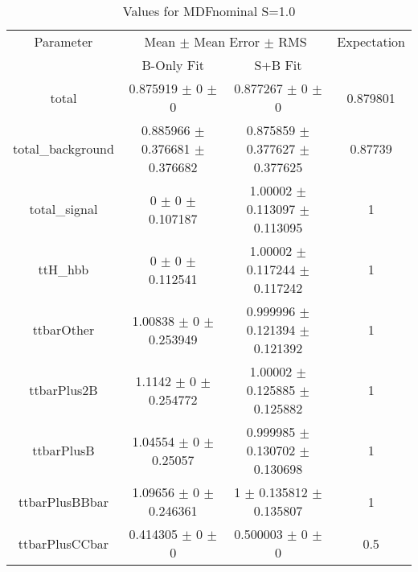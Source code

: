 \begin{table}
\centering
\caption{Values for MDFnominal S=1.0}
\begin{tabular}{cccc}
\toprule
Parameter & \multicolumn{2}{c}{Mean $\pm$ Mean Error $\pm$ RMS} & Expectation\\
 & B-Only Fit & S+B Fit & \\
\midrule
total & \num{0.875919} $\pm$ \num{0} $\pm$ \num{0} & \num{0.877267} $\pm$ \num{0} $\pm$ \num{0} & \num{0.879801}\\
total\_background & \num{0.885966} $\pm$ \num{0.376681} $\pm$ \num{0.376682} & \num{0.875859} $\pm$ \num{0.377627} $\pm$ \num{0.377625} & \num{0.87739}\\
total\_signal & \num{0} $\pm$ \num{0} $\pm$ \num{0.107187} & \num{1.00002} $\pm$ \num{0.113097} $\pm$ \num{0.113095} & \num{1}\\
ttH\_hbb & \num{0} $\pm$ \num{0} $\pm$ \num{0.112541} & \num{1.00002} $\pm$ \num{0.117244} $\pm$ \num{0.117242} & \num{1}\\
ttbarOther & \num{1.00838} $\pm$ \num{0} $\pm$ \num{0.253949} & \num{0.999996} $\pm$ \num{0.121394} $\pm$ \num{0.121392} & \num{1}\\
ttbarPlus2B & \num{1.1142} $\pm$ \num{0} $\pm$ \num{0.254772} & \num{1.00002} $\pm$ \num{0.125885} $\pm$ \num{0.125882} & \num{1}\\
ttbarPlusB & \num{1.04554} $\pm$ \num{0} $\pm$ \num{0.25057} & \num{0.999985} $\pm$ \num{0.130702} $\pm$ \num{0.130698} & \num{1}\\
ttbarPlusBBbar & \num{1.09656} $\pm$ \num{0} $\pm$ \num{0.246361} & \num{1} $\pm$ \num{0.135812} $\pm$ \num{0.135807} & \num{1}\\
ttbarPlusCCbar & \num{0.414305} $\pm$ \num{0} $\pm$ \num{0} & \num{0.500003} $\pm$ \num{0} $\pm$ \num{0} & \num{0.5}\\
\bottomrule
\end{tabular}
\end{table}